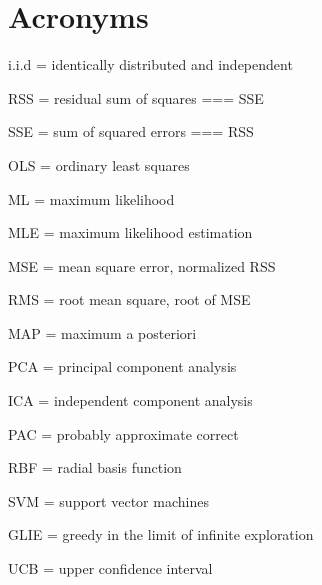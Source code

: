 
\section{Acronyms}
i.i.d = identically distributed and independent

RSS = residual sum of squares === SSE

SSE = sum of squared errors === RSS

OLS = ordinary least squares

ML = maximum likelihood

MLE = maximum likelihood estimation

MSE = mean square error, normalized RSS

RMS = root mean square, root of MSE

MAP = maximum a posteriori

PCA = principal component analysis

ICA = independent component analysis

PAC = probably approximate correct

RBF = radial basis function

SVM = support vector machines

GLIE = greedy in the limit of infinite exploration

UCB = upper confidence interval
